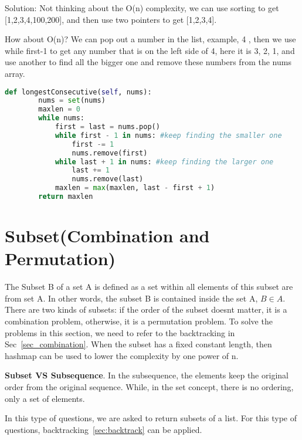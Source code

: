 \documentclass[../main.tex]{subfiles}
\begin{document}
Solution: Not thinking about the O(n) complexity, we can use sorting to get [1,2,3,4,100,200], and then use two pointers to get [1,2,3,4].

How about O(n)? We can pop out a number in the list, example, 4 , then we use while first-1 to get any number that is on the left side of 4, here it is 3, 2, 1, and use another to find all the bigger one and remove these numbers from the nums array.
\begin{lstlisting}[language =Python]
def longestConsecutive(self, nums):
        nums = set(nums)
        maxlen = 0
        while nums:
            first = last = nums.pop()
            while first - 1 in nums: #keep finding the smaller one
                first -= 1
                nums.remove(first)
            while last + 1 in nums: #keep finding the larger one
                last += 1
                nums.remove(last)
            maxlen = max(maxlen, last - first + 1)
        return maxlen
\end{lstlisting}


%
\section{Subset(Combination and Permutation)}
\label{part4_array_subset}
The Subset B of a set A is defined as a set within all elements of this subset are from set A. In other words, the subset B is contained inside the set A, $B \in A$. There are two kinds of subsets: if the order of the subset doesnt matter, it is a combination problem, otherwise, it is a permutation problem. To solve the problems in this section, we need to refer to the backtracking in Sec~\ref{sec_combination}. When the subset has a fixed constant length, then hashmap can be used to lower the complexity by one power of n.

\textbf{Subset VS Subsequence}. In the subsequence, the elements keep the original order from the original sequence. While, in the set concept, there is no ordering, only a set of elements. 

In this type of questions, we are asked to return subsets of a list. For this type of questions, backtracking~\ref{sec:backtrack} can be applied. 
\end{document}
